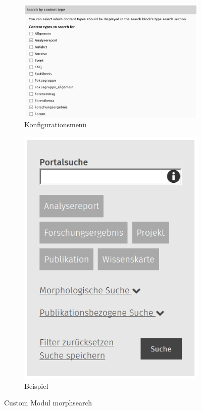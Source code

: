 \begin{figure}[H]
	\centering
	\begin{subfigure}[a]{0.45\textwidth}
		\centering
		\includegraphics[height=0.20\textheight]{images/config_morphsearch}
		\caption[]{Konfigurationsmenü}
		\label{fig:config_morphsearch}
	\end{subfigure}
	\begin{subfigure}[A]{0.25\textwidth}
		\centering
		\includegraphics[height=0.20\textheight]{images/example_morphsearch}
		\caption[]{Beispiel}
		\label{fig:example_morphsearch}
	\end{subfigure}
	\caption{Custom Modul morphsearch}
	\label{fig:morphsearch}
\end{figure}



